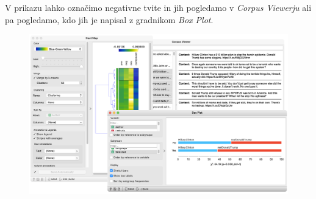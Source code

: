 V prikazu lahko označimo negativne tvite in jih pogledamo v \textit{Corpus Viewerju} ali pa pogledamo, kdo jih je napisal z gradnikom \textit{Box Plot}.

\begin{figure}[h]
    \includegraphics[width=\linewidth]{sentiment-2.png}%
    \caption{}
    \label{fig:011-sentiment2}
\end{figure}